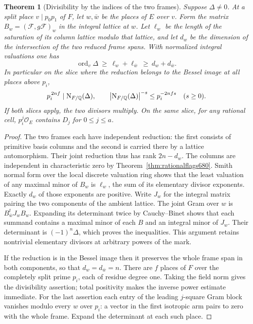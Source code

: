\documentclass[a4paper,11pt]{article}
\newtheorem{theorem}[proposition]{Theorem}
\theoremstyle{definition}
\theoremstyle{remark}
\numberwithin{equation}{section}
\begin{document}
\begin{theorem}[Divisibility by the indices of the two frames]
\leavevmode\label{thm:discriminant681}
Suppose \(\Delta\ne0\). At a split place \(v\mid p_0p_1\) of
\(F\), let \(w,\bar w\) be the places of \(E\) over \(v\). Form the
matrix \(B_w=(\mathcal F,g\mathcal F)_w\) in the integral lattice
at \(w\). Let \(\ell_w\) be the length of the saturation of its
column lattice modulo that lattice, and let \(d_w\) be the
dimension of the intersection of the two reduced frame spans.
With normalized integral valuations one has
\[
 \operatorname{ord}_v\Delta\ \ge\ \ell_w+\ell_{\bar w}
      \ \ge\ d_w+d_{\bar w}.
\]
In particular on the slice where the reduction belongs to the
Bessel image at all places above \(p_i\),
\[
 p_i^{\,2nf}\mid {\rm N}_{F/\mathbb Q}(\Delta),\qquad
 \big|{\rm N}_{F/\mathbb Q}(\Delta)\big|^{-s}
              \le p_i^{-2nfs}\quad(s\ge0).
\]
If both slices apply, the two divisors multiply. On the same
slice, for any rational cell, \(p_i^j\mathcal O_E\) contains
\(D_j\) for \(0\le j\le a\).
\end{theorem}
\begin{proof}
The two frames each have independent reduction: the first consists
of primitive basis columns and the second is carried there by a
lattice automorphism. Their joint reduction thus has rank
\(2n-d_w\). The columns are independent in characteristic zero
by Theorem~\ref{thm:rationalflags680}. Smith normal form over
the local discrete valuation ring shows that the least valuation
of any maximal minor of \(B_w\) is \(\ell_w\), the sum of its
elementary divisor exponents. Exactly \(d_w\) of those exponents
are positive. Write \(J_w\) for the integral matrix pairing the
two components of the ambient lattice. The joint Gram over \(w\)
is \(B_{\bar w}^t J_w B_w\). Expanding its determinant twice by
Cauchy--Binet shows that each summand contains a maximal minor
of each \(B\) and an integral minor of \(J_w\). Their determinant
is \((-1)^n\Delta\), which proves the inequalities. This argument
retains nontrivial elementary divisors at arbitrary powers of
the mark.

If the reduction is in the Bessel image then it preserves the
whole frame span in both components, so that \(d_w=d_{\bar w}=n\).
There are \(f\) places of \(F\) over the completely split prime
\(p_i\), each of residue degree one. Taking the field norm gives
the divisibility assertion; total positivity makes the inverse
power estimate immediate. For the last assertion each entry of
the leading \(j\)-square Gram block vanishes modulo every \(w\)
over \(p_i\): a vector in the first isotropic arm pairs to zero
with the whole frame. Expand the determinant at each such place.
\end{proof}
\end{document}

